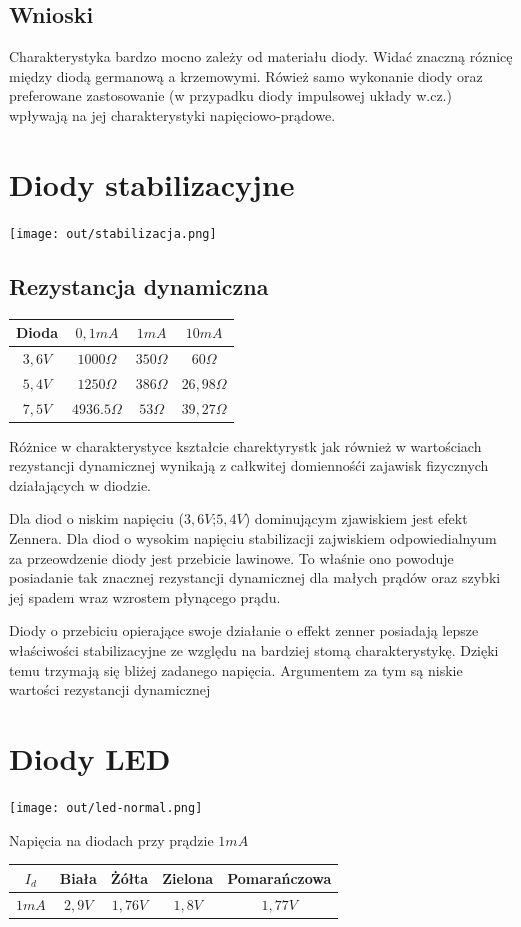 \documentclass[11pt]{article}
\begin{document}
\subsection{Wnioski}
Charakterystyka bardzo mocno zależy od materiału diody. Widać znaczną róznicę między diodą germanową a krzemowymi. Rówież samo wykonanie diody oraz preferowane zastosowanie (w przypadku diody impulsowej układy w.cz.) wpływają na jej charakterystyki napięciowo-prądowe.
\section{Diody stabilizacyjne}
\begin{center}
\texttt{[image: out/stabilizacja.png]}
\end{center}
\subsection{Rezystancja dynamiczna}
\begin{center}
\begin{tabular}{|c|c|c|c|}
\hline
Dioda & $0,1mA$ & $1mA$ & $10mA$ \\
\hline
$3,6V$ & $1000 \Omega$ & $350 \Omega$ & $60 \Omega$ \\
\hline
$5,4V$ & $1250 \Omega$ & $386 \Omega$ & $26,98 \Omega$ \\
\hline
$7,5V$ & $4936.5 \Omega$ & $53 \Omega$ & $39,27 \Omega$ \\
\hline
\end{tabular}
\end{center}
Różnice w charakterystyce kształcie charektyrystk jak również w wartościach
rezystancji dynamicznej wynikają z całkwitej domiennośći zajawisk fizycznych
działających w diodzie.

Dla diod o niskim napięciu ($3,6V$;$5,4V$) dominującym zjawiskiem jest efekt Zennera. Dla diod o wysokim napięciu stabilizacji zajwiskiem odpowiedialnyum za przeowdzenie diody jest przebicie lawinowe.
To właśnie ono powoduje posiadanie tak znacznej rezystancji dynamicznej dla małych prądów oraz szybki jej spadem wraz wzrostem płynącego prądu.

Diody o przebiciu opierające swoje działanie o effekt zenner posiadają lepsze właściwości stabilizacyjne ze względu na bardziej stomą charakterystykę. Dzięki temu trzymają się bliżej zadanego napięcia. Argumentem za tym są niskie wartości rezystancji dynamicznej 

\section{Diody LED}
\begin{center}
\texttt{[image: out/led-normal.png]}
\end{center}
Napięcia na diodach przy prądzie $1mA$
\begin{center}
\begin{tabular}{|c|c|c|c|c|}
  \hline
  $I_d$ & Biała & Żółta & Zielona & Pomarańczowa \\
  \hline
  $1mA$ & $2,9V$ & $1,76V$& $1,8V$ & $1,77V$ \\
  \hline
\end{tabular}
\end{center}
\end{document}
